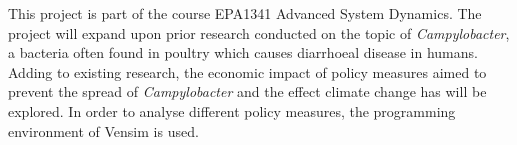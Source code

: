 















This project is part of the course EPA1341 Advanced System Dynamics. The project will expand upon prior research conducted on the topic of \textit{Campylobacter}, a bacteria often found in poultry which causes diarrhoeal disease in humans. Adding to existing research, the economic impact of policy measures aimed to prevent the spread of  \textit{Campylobacter} and the effect climate change has will be explored. In order to analyse different policy measures, the programming environment of Vensim is used. 

